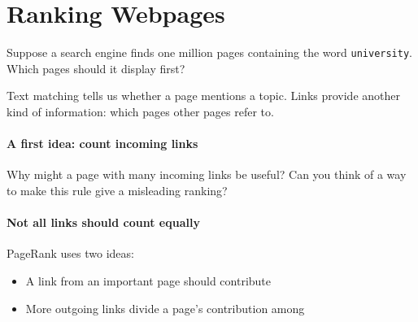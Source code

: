\documentclass[11pt]{article}
\begin{document}


\section{Ranking Webpages}
Suppose a search engine finds one million pages containing the word
\texttt{university}. Which pages should it display first?

Text matching tells us whether a page mentions a topic. Links provide another
kind of information: which pages other pages refer to.

\paragraph{A first idea: count incoming links}
Why might a page with many incoming links be useful? Can you think of a way
to make this rule give a misleading ranking?
\vs{1.2cm}

\paragraph{Not all links should count equally}
PageRank uses two ideas:
\begin{itemize}
    \item A link from an important page should contribute 
    \vs{.3cm}
    \item More outgoing links divide a page's contribution among
\end{itemize}
\end{document}
